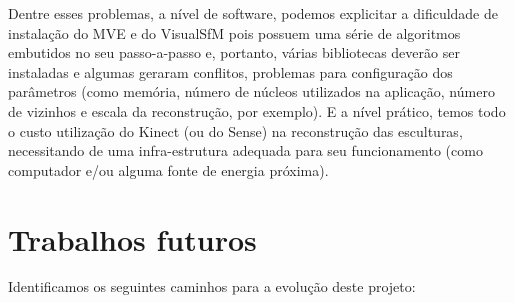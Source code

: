Dentre esses problemas, a nível de software, podemos explicitar a dificuldade de instalação do MVE e do VisualSfM pois possuem uma série de algoritmos embutidos no seu passo-a-passo e, portanto, várias bibliotecas deverão ser instaladas e algumas geraram conflitos, problemas para configuração dos parâmetros (como memória, número de núcleos utilizados na aplicação, número de vizinhos e escala da reconstrução, por exemplo). E a nível prático, temos todo o custo utilização do Kinect (ou do Sense) na reconstrução das esculturas, necessitando de uma infra-estrutura adequada para seu funcionamento (como computador e/ou alguma fonte de energia próxima).

\section*{Trabalhos futuros} Identificamos os seguintes caminhos para a evolução deste projeto:

